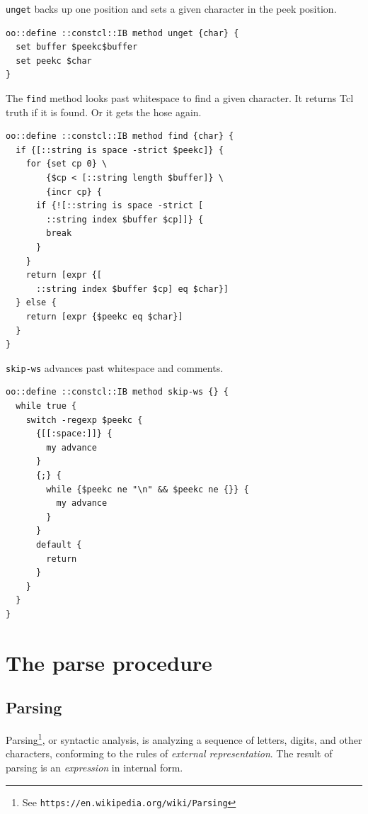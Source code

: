 \documentclass[twoside,9pt]{report}
\begin{document}
\texttt{unget} backs up one position and sets a given character in the peek position.

\noindent\makebox[\linewidth]{\rule{\linewidth}{0.4pt}}
\begin{lstlisting}
oo::define ::constcl::IB method unget {char} {
  set buffer $peekc$buffer
  set peekc $char
}
\end{lstlisting}
\noindent\makebox[\linewidth]{\rule{\linewidth}{0.4pt}}

The \texttt{find} method looks past whitespace to find a given character. It returns Tcl truth if it is found. Or it gets the hose again.

\noindent\makebox[\linewidth]{\rule{\linewidth}{0.4pt}}
\begin{lstlisting}
oo::define ::constcl::IB method find {char} {
  if {[::string is space -strict $peekc]} {
    for {set cp 0} \
        {$cp < [::string length $buffer]} \
        {incr cp} {
      if {![::string is space -strict [
        ::string index $buffer $cp]]} {
        break
      }
    }
    return [expr {[
      ::string index $buffer $cp] eq $char}]
  } else {
    return [expr {$peekc eq $char}]
  }
}
\end{lstlisting}
\noindent\makebox[\linewidth]{\rule{\linewidth}{0.4pt}}

\texttt{skip-ws} advances past whitespace and comments.

\noindent\makebox[\linewidth]{\rule{\linewidth}{0.4pt}}
\begin{lstlisting}
oo::define ::constcl::IB method skip-ws {} {
  while true {
    switch -regexp $peekc {
      {[[:space:]]} {
        my advance
      }
      {;} {
        while {$peekc ne "\n" && $peekc ne {}} {
          my advance
        }
      }
      default {
        return
      }
    }
  }
}
\end{lstlisting}
\noindent\makebox[\linewidth]{\rule{\linewidth}{0.4pt}}
\section{The parse procedure}
\label{the-parse-procedure}
\subsection{Parsing}
\label{parsing}

Parsing\footnote{See \texttt{https://en.wikipedia.org/wiki/Parsing}}, or syntactic analysis, is analyzing a sequence of letters, digits, and other characters, conforming to the rules of \emph{external representation}. The result of parsing is an \emph{expression} in internal form.
\end{document}
